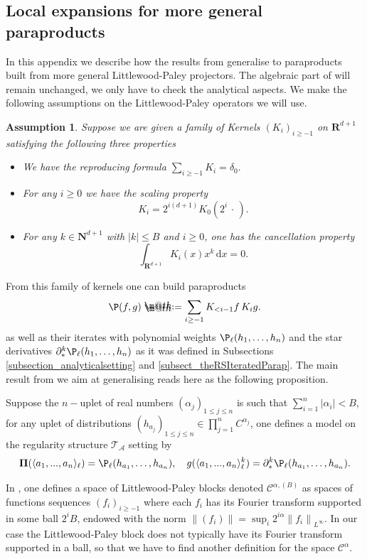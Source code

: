 \documentclass[11pt]{preprint}
\makeatletter
\newcommand{\mcA}{\mathcal{A}}
\newcommand{\mcC}{\mathcal{C}}
\newcounter{theorem}
\newtheorem{assumption}{Assumption}
\def\PPi{\boldsymbol{\Pi}}
\newcommand*{\defeq}{\mathrel{\rlap{%
			\raisebox{0.3ex}{$\m@th\cdot$}}%
		\raisebox{-0.3ex}{$\m@th\cdot$}}%
	=}
\renewcommand{\lg}{\langle}
\newcommand{\rg}{\rangle}
\newcommand{\bfN}{\mathbf{N}}
\newcommand{\bfR}{\mathbf{R}}
\newcommand{\scrT}{\mathscr{T}}
\newcommand{\norme}[1]{\left\lVert #1 \right\lVert}
\newcommand{\ddd}{ \text{d} }
\makeatother
\begin{document}
	\begin{appendix}
	
	\section{Local expansions for more general paraproducts}
	\label{appendix_A}
	In this appendix we describe how the results from \cite{LocalExpansionsParacSystems} generalise to paraproducts built from more general Littlewood-Paley projectors. The algebraic part of \cite{LocalExpansionsParacSystems} will remain unchanged, we only have to check the analytical aspects. We make the following assumptions on the Littlewood-Paley operators we will use. 
	
	\begin{assumption}
	Suppose we are given a family of Kernels $(K_i)_{i\geq -1}$ on $\bfR^{d +1}$ satisfying the following three properties  
	\begin{itemize}
	\item We have the reproducing formula
	$
	\sum_{i \geq -1 } K_i = \delta_0.
	$
	\item For any $i\geq 0$ we have the scaling property 
	$$
	K_i = 2^{i (d+1)}K_0( 2^i \, \cdot \, ).
	$$
	\item For any $k\in\bfN^{d+1}$ with $|k|\leq B$ and $i\geq0$, one has the cancellation property
	$$
	\int_{\bfR^{d+1}} K_i(x) x^k \, \ddd x = 0.
	$$
	\end{itemize}
\end{assumption}
From  this family of kernels one can build paraproducts 
	$$
	\P(f,g) \defeq \sum_{i\geq -1} K_{<i-1} f \,  K_i g.
	$$
as well as their iterates with polynomial weights $\P_\ell(h_1,\dots,h_n)$ and the star derivatives $\partial^k_*\P_\ell(h_1,\dots,h_n)$ as it was defined in Subsections  \ref{subsection_analyticalsetting} and \ref{subsect_theRSIteratedParap}. 
The main result from \cite{LocalExpansionsParacSystems} we aim at generalising reads here as the following proposition.
	\begin{proposition} \label{prop_generalisation_LocalDevParap}
		Suppose the $n-$uplet of real numbers $(\alpha_j)_{1\leq j\leq n}$ is such that $\sum_{i=1}^n |\alpha_i| < B$, for any uplet of distributions $(h_{a_j})_{1 \leq j \leq n} \in \prod_{j=1}^n C^{\alpha_j}$, one defines a model on the regularity structure $\scrT_\mcA$ setting by
		$$
		{ \PPi}(\lg a_1,...,a_n\rg_\ell ) = \P_\ell(h_{a_1},\dots,h_{a_n}) 
	,\quad 
		{ g}(\lg a_1,...,a_n\rg_\ell^k ) = \partial^k_*\P_\ell(h_{a_1},\dots,h_{a_n}).
		$$
	\end{proposition}
		In \cite{LocalExpansionsParacSystems}, one defines a space of Littlewood-Paley blocks denoted $\mcC^{\alpha , (B)}$ as spaces of functions sequences $(f_i)_{i\geq -1}$ where each $f_i$ has its Fourier transform supported in some ball $2^i B$, endowed with the norm $\norme{(f_i)}=\sup_i 2^{i\alpha}\norme{f_i}_{L^\infty}$. In our case the Littlewood-Paley block does not typically have its Fourier transform supported in a ball, so that we have to find another definition for the space $\mcC^{\alpha}$.   
	

\end{appendix}
\end{document}
